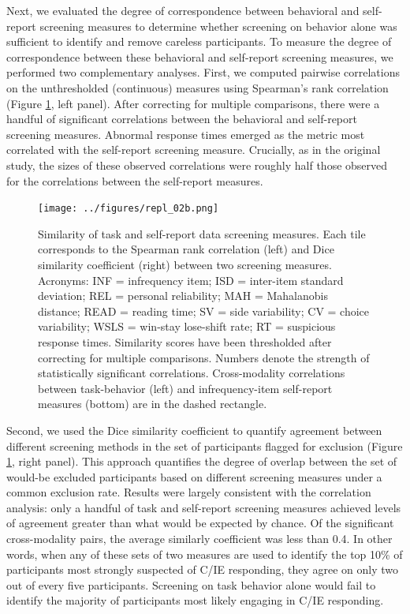 \documentclass[a4paper,notitlepage,12pt]{article}
\begin{document}
\begin{refsection}[supp]
Next, we evaluated the degree of correspondence between behavioral and self-report screening measures to determine whether screening on behavior alone was sufficient to identify and remove careless participants. To measure the degree of correspondence between these behavioral and self-report screening measures, we performed two complementary analyses. First, we computed pairwise correlations on the unthresholded (continuous) measures using Spearman's rank correlation (Figure \ref{fig:repl_correspondence}, left panel). After correcting for multiple comparisons, there were a handful of significant correlations between the behavioral and self-report screening measures. Abnormal response times emerged as the metric most correlated with the self-report screening measure. Crucially, as in the original study, the sizes of these observed correlations were roughly half those observed for the correlations between the self-report measures. 

\begin{figure}[!t]
\texttt{[image: ../figures/repl\_02b.png]}
\centering
\captionsetup{width=0.88\textwidth}
\caption{Similarity of task and self-report data screening measures. Each tile corresponds to the Spearman rank correlation (left) and Dice similarity coefficient (right) between two screening measures. Acronyms: INF = infrequency item; ISD = inter-item standard deviation; REL = personal reliability; MAH = Mahalanobis distance; READ = reading time; SV = side variability; CV = choice variability; WSLS = win-stay lose-shift rate; RT = suspicious response times. Similarity scores have been thresholded after correcting for multiple comparisons. Numbers denote the strength of statistically significant correlations. Cross-modality correlations between task-behavior (left) and infrequency-item self-report measures (bottom) are in the dashed rectangle.}
\label{fig:repl_correspondence}
\end{figure}

Second, we used the Dice similarity coefficient to quantify agreement between different screening methods in the set of participants flagged for exclusion (Figure \ref{fig:repl_correspondence}, right panel). This approach quantifies the degree of overlap between the set of would-be excluded participants based on different screening measures under a common exclusion rate. Results were largely consistent with the correlation analysis: only a handful of task and self-report screening measures achieved levels of agreement greater than what would be expected by chance. Of the significant cross-modality pairs, the average similarly coefficient was less than 0.4. In other words, when any of these sets of two measures are used to identify the top 10\% of participants most strongly suspected of C/IE responding, they agree on only two out of every five participants. Screening on task behavior alone would fail to identify the majority of participants most likely engaging in C/IE responding.


\end{refsection}
\end{document}
